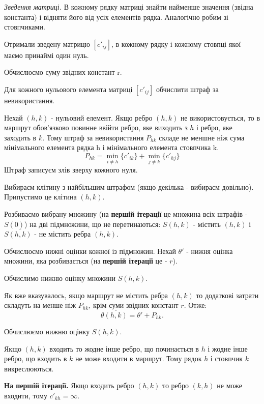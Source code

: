 \documentclass[12pt,a4paper]{report}
\newenvironment{slim_enumerate}{
\begin{enumerate}
  \setlength{\itemsep}{1pt}
  \setlength{\parskip}{0pt}
  \setlength{\parsep}{0pt}}
{\end{enumerate}}
\begin{document}
\begin{slim_enumerate}
  \item {\it Зведення матриці.} В кожному рядку матриці знайти найменше значення (звідна константа) і відняти його від усіх елементів рядка. Аналогічно робим зі стовпчиками.

Отримали зведену матрицю $[c'_{ij}]$, в кожному рядку і кожному стовпці якої маємо принаймі один нуль.

Обчислюємо суму звідних констант r.

  \item Для кожного нульового елемента матриці $[c'_{ij}]$ обчислити штраф за невикористання.

Нехай $(h,k)$ - нульовий елемент. Якщо ребро $(h,k)$ не використовується, то в маршрут обов’язково повинне ввійти ребро, яке виходить з $h$ і ребро, яке заходить в $k$. Тому штраф за невикористання $P_{h k}$ складе не меншне ніж сума мінімального елемента рядка h і мінімального елемента стовпчика k.
\[ P_{h k} = \displaystyle\min_{i \neq h}\{c'_{i k}\} + \displaystyle\min_{j \neq k}\{c'_{h j}\} \]
Штраф записуєм злів зверху кожного нуля.

  \item Вибираєм клітину з найбільшим штрафом (якщо декілька - вибираєм довільно). Припустимо це клітина $(h, k)$. 

Розбиваємо вибрану множину (на {\bf першій ітерації} це множина всіх штрафів - $S(0)$) на дві підмножини, що не перетинаються: $S(h,k)$ - містить $(h,k)$ і $S \overline{(h,k)}$ - не містить ребра $(h, k)$.

  \item Обчислюємо нижні оцінки кожної із підмножин. Нехай $\theta'$ - нижня оцінка множини, яка розбивається (на {\bf першій ітерації} це - $r$).
  \begin{slim_enumerate}
    \item Обчислимо нижню оцінку множини $S \overline{(h,k)}$.

Як вже вказувалось, якщо маршрут не містить ребра $(h,k)$ то додаткові затрати складуть на менше ніж $P_{h k}$, крім суми звідних констант $r$. Отже:
\[ \theta \overline{(h,k)} = \theta'+P_{h k}. \]
    \item Обчислюємо нижню оцінку $S(h,k)$.
    \begin{slim_enumerate}
      \item Якщо $(h,k)$ входить то жодне інше ребро, що починається в $h$ і жодне інше ребро, що входить в $k$ не може входити в маршрут. Тому рядок $h$ і стовпчик $k$ викреслюються.
      \item {\bf На першій ітерації.} Якщо входить ребро $(h,k)$ то ребро $(k,h)$ не може входити, тому $c'_{k h} = \infty$.


\end{slim_enumerate}
\end{slim_enumerate}
\end{slim_enumerate}
\end{document}
